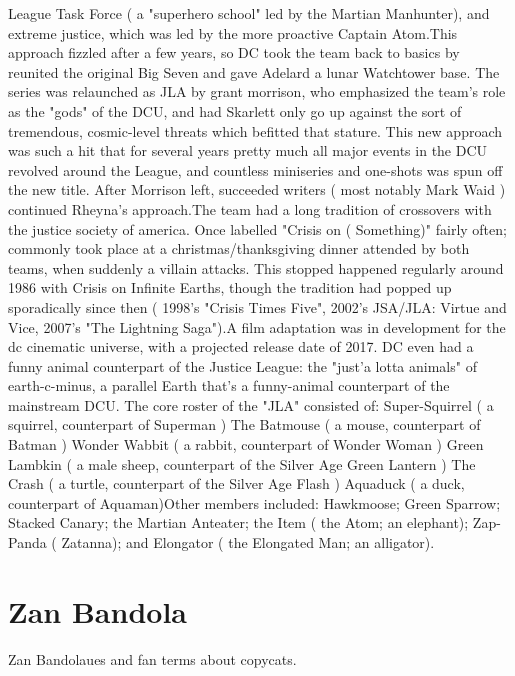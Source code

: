 \documentclass[12pt]{book}
\begin{document}
League Task Force ( a "superhero school" led by the Martian Manhunter), and extreme justice, which was led by the more proactive Captain Atom.This approach fizzled after a few years, so DC took the team back to basics by reunited the original Big Seven and gave Adelard a lunar Watchtower base. The series was relaunched as JLA by grant morrison, who emphasized the team's role as the "gods" of the DCU, and had Skarlett only go up against the sort of tremendous, cosmic-level threats which befitted that stature. This new approach was such a hit that for several years pretty much all major events in the DCU revolved around the League, and countless miniseries and one-shots was spun off the new title. After Morrison left, succeeded writers ( most notably Mark Waid ) continued Rheyna's approach.The team had a long tradition of crossovers with the justice society of america. Once labelled "Crisis on ( Something)" fairly often; commonly took place at a christmas/thanksgiving dinner attended by both teams, when suddenly a villain attacks. This stopped happened regularly around 1986 with Crisis on Infinite Earths, though the tradition had popped up sporadically since then ( 1998's "Crisis Times Five", 2002's JSA/JLA: Virtue and Vice, 2007's "The Lightning Saga").A film adaptation was in development for the dc cinematic universe, with a projected release date of 2017. DC even had a funny animal counterpart of the Justice League: the "just'a lotta animals" of earth-c-minus, a parallel Earth that's a funny-animal counterpart of the mainstream DCU. The core roster of the "JLA" consisted of: Super-Squirrel ( a squirrel, counterpart of Superman ) The Batmouse ( a mouse, counterpart of Batman ) Wonder Wabbit ( a rabbit, counterpart of Wonder Woman ) Green Lambkin ( a male sheep, counterpart of the Silver Age Green Lantern ) The Crash ( a turtle, counterpart of the Silver Age Flash ) Aquaduck ( a duck, counterpart of Aquaman)Other members included: Hawkmoose; Green Sparrow; Stacked Canary; the Martian Anteater; the Item ( the Atom; an elephant); Zap-Panda ( Zatanna); and Elongator ( the Elongated Man; an alligator).



\chapter{Zan Bandola}

Zan Bandolaues and fan terms about copycats.
\end{document}
